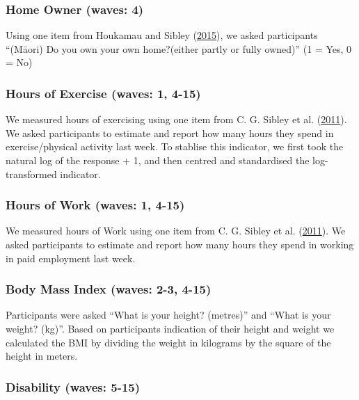 \documentclass[
  singlecolumn]{report}
\begin{document}
\hypertarget{home-owner-waves-4}{%
\subsubsection{Home Owner (waves: 4)}\label{home-owner-waves-4}}

Using one item from Houkamau and Sibley
(\protect\hyperlink{ref-houkamau_looking_2015}{2015}), we asked
participants ``(Māori) Do you own your own home?(either partly or fully
owned)'' (1 = Yes, 0 = No)

\hypertarget{hours-of-exercise-waves-1-4-15}{%
\subsubsection{Hours of Exercise (waves: 1,
4-15)}\label{hours-of-exercise-waves-1-4-15}}

We measured hours of exercising using one item from C. G. Sibley et al.
(\protect\hyperlink{ref-sibley2011}{2011}). We asked participants to
estimate and report how many hours they spend in exercise/physical
activity last week. To stablise this indicator, we first took the
natural log of the response + 1, and then centred and standardised the
log-transformed indicator.

\hypertarget{hours-of-work-waves-1-4-15}{%
\subsubsection{Hours of Work (waves: 1,
4-15)}\label{hours-of-work-waves-1-4-15}}

We measured hours of Work using one item from C. G. Sibley et al.
(\protect\hyperlink{ref-sibley2011}{2011}). We asked participants to
estimate and report how many hours they spend in working in paid
employment last week.

\hypertarget{body-mass-index-waves-2-3-4-15}{%
\subsubsection{Body Mass Index (waves: 2-3,
4-15)}\label{body-mass-index-waves-2-3-4-15}}

Participants were asked ``What is your height? (metres)'' and ``What is
your weight? (kg)''. Based on participants indication of their height
and weight we calculated the BMI by dividing the weight in kilograms by
the square of the height in meters.

\hypertarget{disability-waves-5-15}{%
\subsubsection{Disability (waves: 5-15)}\label{disability-waves-5-15}}
\end{document}
